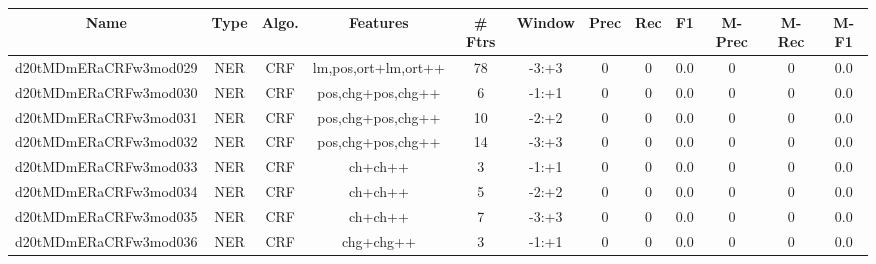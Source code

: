 \documentclass[a4paper]{article}
\begin{document}
\begin{landscape}
\begin{center}
\begin{tabular}{ |c|c|c|c|c|c|c|c|c|c|c|c|} 
 \hline
 	Name & Type & Algo. & Features & \# Ftrs & Window & Prec & Rec & F1 & M-Prec & M-Rec & M-F1\\
 \hline

 	

 
 	
 	\small{ d20tMDmERaCRFw3mod029 } & \small{ NER} & \small{  CRF }  & lm,pos,ort+lm,ort++  &  78 &  \small{  -3:+3 }  &  0 & 0 & 0.0  &  0 & 0 & 0.0 \\
 	

 
 	
 	\small{ d20tMDmERaCRFw3mod030 } & \small{ NER} & \small{  CRF }  & pos,chg+pos,chg++  &  6 &  \small{  -1:+1 }  &  0 & 0 & 0.0  &  0 & 0 & 0.0 \\
 	

 
 	
 	\small{ d20tMDmERaCRFw3mod031 } & \small{ NER} & \small{  CRF }  & pos,chg+pos,chg++  &  10 &  \small{  -2:+2 }  &  0 & 0 & 0.0  &  0 & 0 & 0.0 \\
 	

 
 	
 	\small{ d20tMDmERaCRFw3mod032 } & \small{ NER} & \small{  CRF }  & pos,chg+pos,chg++  &  14 &  \small{  -3:+3 }  &  0 & 0 & 0.0  &  0 & 0 & 0.0 \\
 	

 
 	
 	\small{ d20tMDmERaCRFw3mod033 } & \small{ NER} & \small{  CRF }  & ch+ch++  &  3 &  \small{  -1:+1 }  &  0 & 0 & 0.0  &  0 & 0 & 0.0 \\
 	

 
 	
 	\small{ d20tMDmERaCRFw3mod034 } & \small{ NER} & \small{  CRF }  & ch+ch++  &  5 &  \small{  -2:+2 }  &  0 & 0 & 0.0  &  0 & 0 & 0.0 \\
 	

 
 	
 	\small{ d20tMDmERaCRFw3mod035 } & \small{ NER} & \small{  CRF }  & ch+ch++  &  7 &  \small{  -3:+3 }  &  0 & 0 & 0.0  &  0 & 0 & 0.0 \\
 	

 
 	
 	\small{ d20tMDmERaCRFw3mod036 } & \small{ NER} & \small{  CRF }  & chg+chg++  &  3 &  \small{  -1:+1 }  &  0 & 0 & 0.0  &  0 & 0 & 0.0 \\
 	


\end{tabular}
\end{center}
\end{landscape}
\end{document}
